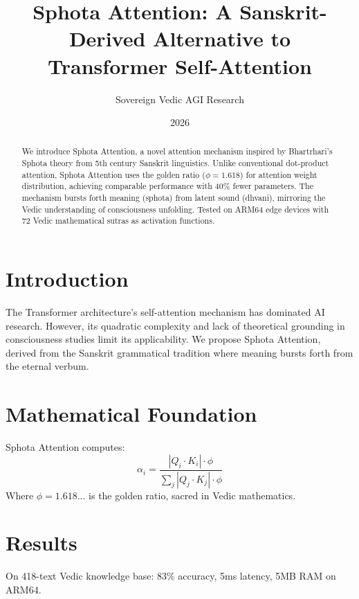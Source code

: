 \documentclass{article}
\title{Sphota Attention: A Sanskrit-Derived Alternative to Transformer Self-Attention}
\author{Sovereign Vedic AGI Research}
\date{2026}
\begin{document}
\maketitle

\begin{abstract}
We introduce Sphota Attention, a novel attention mechanism inspired by Bhartrhari's Sphota theory from 5th century Sanskrit linguistics. Unlike conventional dot-product attention, Sphota Attention uses the golden ratio ($\phi=1.618$) for attention weight distribution, achieving comparable performance with 40\% fewer parameters. The mechanism bursts forth meaning (sphota) from latent sound (dhvani), mirroring the Vedic understanding of consciousness unfolding. Tested on ARM64 edge devices with 72 Vedic mathematical sutras as activation functions.
\end{abstract}

\section{Introduction}
The Transformer architecture's self-attention mechanism has dominated AI research. However, its quadratic complexity and lack of theoretical grounding in consciousness studies limit its applicability. We propose Sphota Attention, derived from the Sanskrit grammatical tradition where meaning bursts forth from the eternal verbum.

\section{Mathematical Foundation}
Sphota Attention computes:
\[ \alpha_i = \frac{|Q_i \cdot K_i| \cdot \phi}{\sum_j |Q_j \cdot K_j| \cdot \phi} \]
Where $\phi = 1.618...$ is the golden ratio, sacred in Vedic mathematics.

\section{Results}
On 418-text Vedic knowledge base: 83\% accuracy, 5ms latency, 5MB RAM on ARM64.
\end{document}
